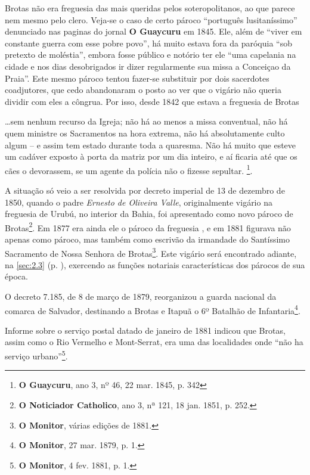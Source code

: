 Brotas não era freguesia das mais queridas pelos soteropolitanos, ao que parece nem mesmo pelo clero. Veja-se o caso de certo pároco ``português lusitaníssimo'' denunciado nas paginas do jornal \textbf{O Guaycuru} em 1845. Ele, além de ``viver em constante guerra com esse pobre povo'', há muito estava fora da paróquia ``sob pretexto de moléstia'', embora fosse público e notório ter ele ``uma capelania na cidade e nos dias desobrigados ir dizer regularmente sua missa a Conceiçao da Praia''. Este mesmo pároco tentou fazer-se substituir por dois sacerdotes coadjutores, que cedo abandonaram o posto ao ver que o vigário não queria dividir com eles a côngrua. Por isso, desde 1842 que estava a freguesia de Brotas 

\begin{citacao}
\dots sem nenhum recurso da Igreja; não há ao menos a missa conventual, não há quem ministre os Sacramentos na hora extrema, não há absolutamente culto algum -- e assim tem estado durante toda a quaresma. Não há muito que esteve um cadáver exposto à porta da matriz por um dia inteiro, e aí ficaria até que os cães o devorassem, se um agente da polícia não o fizesse sepultar. \footnote{\textbf{O Guaycuru}, ano 3, nº 46, 22 mar. 1845, p. 342}. 
\end{citacao}

A situação só veio a ser resolvida por decreto imperial de 13 de dezembro de 1850, quando o padre \textit{Ernesto de Oliveira Valle}, originalmente vigário na freguesia de Urubú, no interior da Bahia, foi apresentado como novo pároco de Brotas\footnote{\textbf{O Noticiador Catholico}, ano 3, nª 121, 18 jan. 1851, p. 252.}. Em 1877 era ainda ele o pároco da freguesia \cite[p.~176]{macosta_almana_1877}, e em 1881 figurava não apenas como pároco, mas também como escrivão da irmandade do Santíssimo Sacramento de Nossa Senhora de Brotas\footnote{\textbf{O Monitor}, várias edições de 1881.}. Este vigário será encontrado adiante, na \autoref{sec:2.3} (p. \pageref{sec:2.3}), exercendo as funções notariais características dos párocos de sua época.



O decreto 7.185, de 8 de março de 1879, reorganizou a guarda nacional da comarca de Salvador, destinando a Brotas e Itapuã o 6º Batalhão de Infantaria\footnote{\textbf{O Monitor}, 27 mar. 1879, p. 1.}.


Informe sobre o serviço postal datado de janeiro de 1881 indicou que Brotas, assim como o Rio Vermelho e Mont-Serrat, era uma das localidades onde ``não ha serviço urbano''\footnote{\textbf{O Monitor}, 4 fev. 1881, p. 1.}.